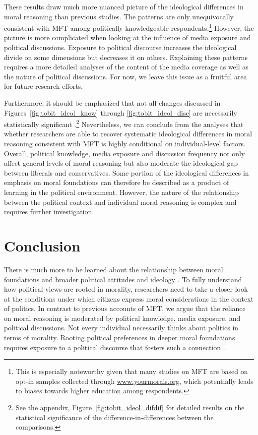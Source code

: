 \documentclass[12pt]{article}
\begin{document}
These results draw much more nuanced picture of the ideological differences in moral reasoning than previous studies. The patterns are only unequivocally consistent with MFT among politically knowledgeable respondents.\footnote{This is especially noteworthy given that many studies on MFT are based on opt-in samples collected through \url{www.yourmorals.org}, which potentially leads to biases towards higher education among respondents.} However, the picture is more complicated when looking at the influence of media exposure and political discussions. Exposure to political discourse increases the ideological divide on some dimensions but decreases it on others. Explaining these patterns requires a more detailed analyses of the content of the media coverage as well as the nature of political discussions. For now, we leave this issue as a fruitful area for future research efforts.

Furthermore, it should be emphasized that not all changes discussed in Figures~\ref{fig:tobit_ideol_know} through \ref{fig:tobit_ideol_disc} are necessarily statistically significant \citep[c.f.,][]{gelman2006difference}.\footnote{See the appendix, Figure~\ref{fig:tobit_ideol_difdif} for detailed results on the statistical significance of the difference-in-differences between the comparisons.} Nevertheless, we can conclude from the analyses that whether researchers are able to recover systematic ideological differences in moral reasoning consistent with MFT is highly conditional on individual-level factors. Overall, political knowledge, media exposure and discussion frequency not only affect general levels of moral reasoning but also moderate the ideological gap between liberals and conservatives. Some portion of the ideological differences in emphasis on moral foundations can therefore be described as a product of learning in the political environment. However, the nature of the relationship between the political context and individual moral reasoning is complex and requires further investigation.


\section{Conclusion}

There is much more to be learned about the relationship between moral foundations and broader political attitudes and ideology \citep[e.g.,][]{feldman2013political}. To fully understand how political views are rooted in morality, researchers need to take a closer look at the conditions under which citizens express moral considerations in the context of politics. In contrast to previous accounts of MFT, we argue that the reliance on moral reasoning is moderated by political knowledge, media exposure, and political discussions. Not every individual necessarily thinks about politics in terms of morality. Rooting political preferences in deeper moral foundations requires exposure to a political discourse that fosters such a connection \citep[c.f.,][]{clifford2015concerns}.
\end{document}
